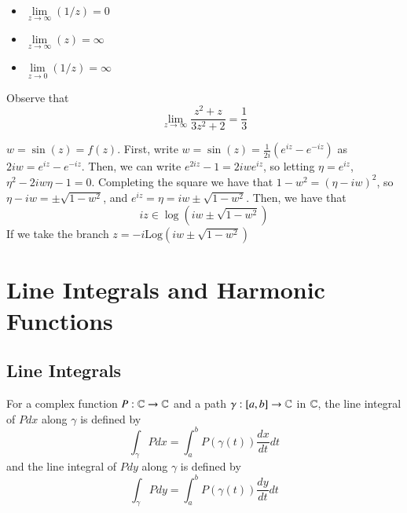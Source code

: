 \documentclass[12pt, a4paper, oneside, openright, titlepage]{book}
\begin{document}
\begin{eg}
    \leavevmode
    \begin{itemize}
        \item $\lim\limits_{z\rightarrow \infty}(1/z) = 0$
        \item $\lim\limits_{z\rightarrow \infty}(z) = \infty$
        \item $\lim\limits_{z\rightarrow 0}(1/z) = \infty$
    \end{itemize}
\end{eg}

\begin{eg}
    Observe that \begin{equation*}
        \lim\limits_{z\rightarrow \infty}\frac{z^2+z}{3z^2+2} = \frac{1}{3}
    \end{equation*}
\end{eg}

\begin{eg}
    $w = \sin(z) = f(z)$. First, write $w=\sin(z) = \frac{1}{2i}(e^{iz}-e^{-iz})$ as $2iw = e^{iz}-e^{-iz}$. Then, we can write $e^{2iz}-1 = 2iwe^{iz}$, so letting $\eta = e^{iz}$, $\eta^2 - 2iw\eta -1 = 0$. Completing the square we have that $1 -w^2= (\eta-iw)^2$, so $\eta-iw = \pm \sqrt{1-w^2}$, and $e^{iz}=\eta = iw\pm\sqrt{1-w^2}$. Then, we have that \begin{equation*}
        iz \in \log(iw\pm\sqrt{1-w^2})
    \end{equation*}
    If we take the branch $z = -i\text{Log}(iw\pm \sqrt{1-w^2})$
\end{eg}





\chapter{Line Integrals and Harmonic Functions}


\section{Line Integrals}


\begin{defn}
    For a complex function $P:\mathbb C\rightarrow \mathbb C$ and a path $\gamma:[a,b]\rightarrow \mathbb C$ in $\mathbb C$, the line integral of $Pdx$ along $\gamma$ is defined by \begin{equation*}
        \int_{\gamma}Pdx = \int_{a}^{b}P(\gamma(t))\frac{dx}{dt}dt
    \end{equation*}
    and the line integral of $Pdy$ along $\gamma$ is defined by \begin{equation*}
        \int_{\gamma}Pdy = \int_{a}^{b}P(\gamma(t))\frac{dy}{dt}dt
    \end{equation*}
\end{defn}
\end{document}

